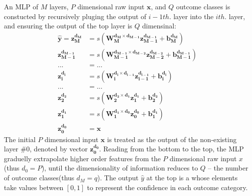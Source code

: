 \documentclass[twocolumn]{article}
\begin{document}
An MLP of $M$ layers, $P$ dimensional raw input $\boldsymbol{x}$, and $Q$ outcome classes is constucted by recursively pluging the output of $i-1 th.$ layer into the $i th.$ layer, and ensuring the output of the top layer is $Q$ dimensinal:
\begin{equation*} \label{eq_MLP}
\begin{split}
  \boldsymbol{\hat{y}}=
  \boldsymbol{z_M^{d_M}}         &= s(\boldsymbol{W_M^{d_M \times d_{M-1}}z_{M-1}^{d_{M-1}}}+\boldsymbol{b_M^{d_M}}) \\
  \boldsymbol{z_{M-1}^{d_{M-1}}} &= s(\boldsymbol{W_{M-1}^{d_{M-1} \times d_{M-2}}z_{M-2}^{d_{M-2}}}+\boldsymbol{b_{M-1}^{d_{M-1}}}) \\
  ... &= ... \\
  \boldsymbol{z_i^{d_i}}         &= s(\boldsymbol{W_i^{d_i \times d_{i-1}}z_{i-1}^{d_{i-1}}}+\boldsymbol{b_i^{d_i}}) \\
  ... &= ... \\
  \boldsymbol{z_2^{d_2}}         &= s(\boldsymbol{W_2^{d_2 \times d_1}z_1^{d_1}}+\boldsymbol{b_2^{d_2}}) \\
  \boldsymbol{z_1^{d_1}}         &= s(\boldsymbol{W_1^{d_1 \times d_0}z_0^{d_0}}+\boldsymbol{b_1^{d_1}}) \\
  \boldsymbol{z_0^{d_0}}         &= \boldsymbol{x}
\end{split}
\end{equation*}
The initial $P$ dimensional input $\boldsymbol{x}$ is treated as the output of the non-existing layer $\#0$, denoted by vector $\boldsymbol{z_0^{d_0}}$. Reading from the bottom to the top, the MLP graduelly extrapolate higher order features from the $P$ dimensional raw input $x$ (thus $d_0=P$), until the dimensionality of information reduces to $Q$ -- the number of outcome classes(thus $d_M=q$). The output $\hat{y}$ at the top is a whose elements take values between $[0,1]$ to represent the confidence in each outcome category.
\end{document}
